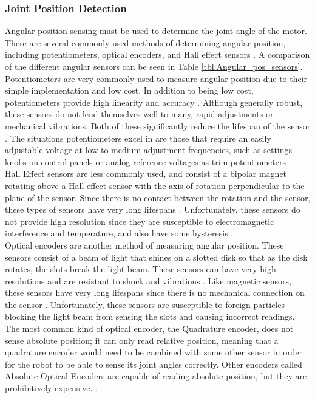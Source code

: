 \subsubsection{Joint Position Detection}
Angular position sensing must be used to determine the joint angle of the motor. There are several commonly used methods of determining angular position, including potentiometers, optical encoders, and Hall effect sensors \cite{Pot_vs_Sensor,Choose_Sensor_Technology,Choose_Position_Sensor}. A comparison of the different angular sensors can be seen in Table \ref{tbl:Angular_pos_sensors}. \\
\newline
Potentiometers are very commonly used to measure angular position due to their simple implementation and low cost. In addition to being low cost, potentiometers provide high linearity and accuracy \cite{Choose_Position_Sensor}. Although generally robust, these sensors do not lend themselves well to many, rapid adjustments or mechanical vibrations. Both of these significantly reduce the lifespan of the sensor \cite{Pot_vs_Sensor,Choose_Position_Sensor}. The situations potentiometers excel in are those that require an easily adjustable voltage at low to medium adjustment frequencies, such as settings knobs on control panels or analog reference voltages as trim potentiometers \cite{Pot_vs_Sensor}. \\
\newline
Hall Effect sensors are less commonly used, and consist of a bipolar magnet rotating above a Hall effect sensor with the axis of rotation perpendicular to the plane of the sensor. Since there is no contact between the rotation and the sensor, these types of sensors have very long lifespans \cite{Pot_vs_Sensor}. Unfortunately, these sensors do not provide high resolution since they are susceptible to electromagnetic interference and temperature, and also have some hysteresis \cite{Choose_Position_Sensor}. \\
\newline
Optical encoders are another method of measuring angular position. These sensors consist of a beam of light that shines on a slotted disk so that as the disk rotates, the slots break the light beam. These sensors can have very high resolutions and are resistant to shock and vibrations \cite{Choose_Sensor_Technology}. Like magnetic sensors, these sensors have very long lifespans since there is no mechanical connection on the sensor \cite{Pot_vs_Sensor}. Unfortunately, these sensors are susceptible to foreign particles blocking the light beam from sensing the slots and causing incorrect readings. The most common kind of optical encoder, the Quadrature encoder, does not sense absolute position; it can only read relative position, meaning that a quadrature encoder would need to be combined with some other sensor in order for the robot to be able to sense its joint angles correctly. Other encoders called Absolute Optical Encoders are capable of reading absolute position, but they are prohibitively expensive. \cite{Choose_Position_Sensor}. \\
